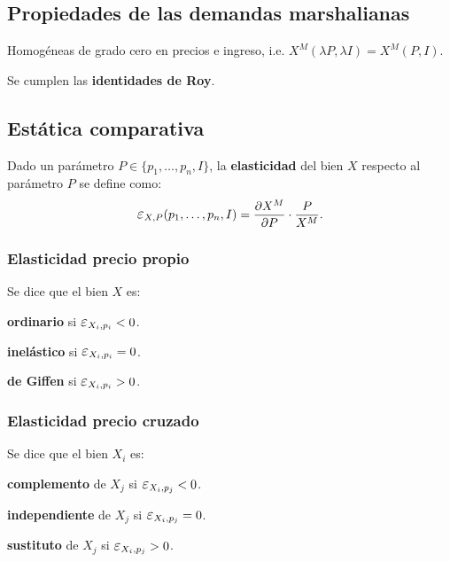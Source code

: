 \documentclass[8pt,a4paper]{extarticle}
\begin{document}
\begin{multicols}{3}
\subsection{Propiedades de las demandas marshalianas}

\begin{eqlist}
\item Homogéneas de grado cero en precios e ingreso, i.e. $X^M (\lambda P, \lambda I) = X^M(P, I)$.
\item Se cumplen las \textbf{identidades de Roy}.
\end{eqlist}

\subsection{Estática comparativa}

\begin{boxdef}[Elasticidad]
	Dado un parámetro $P \in \{ p_1,\ldots, p_n, I \}$, la \textbf{elasticidad} del bien $X$ respecto al parámetro $P$ se define como:
	\[
		\E_{X, P} (p_1,\ldots, p_n, I) = \frac{\partial X^M}{\partial P} \cdot \frac{P}{X^M}
	.\] 
\end{boxdef}

\sectionbreak

\subsubsection*{Elasticidad precio propio}

Se dice que el bien $X$ es:

\begin{eqlist}
\item \textbf{ordinario} si $ \E_{X_i, p_i} < 0$.
\item \textbf{inelástico} si $\E_{X_i, p_i} = 0$.
\item \textbf{de Giffen} si $\E_{X_i, p_i} > 0$.
\end{eqlist}

\subsubsection*{Elasticidad precio cruzado}

Se dice que el bien $X_i$ es:

\begin{eqlist}
\item \textbf{complemento} de $X_j$ si $\E_{X_i, p_j} < 0$.
\item \textbf{independiente} de $X_j$ si $\E_{X_i, p_j} = 0$.
\item \textbf{sustituto} de $X_j$ si $\E_{X_i, p_j} > 0$.
\end{eqlist}


\end{multicols}
\end{document}
